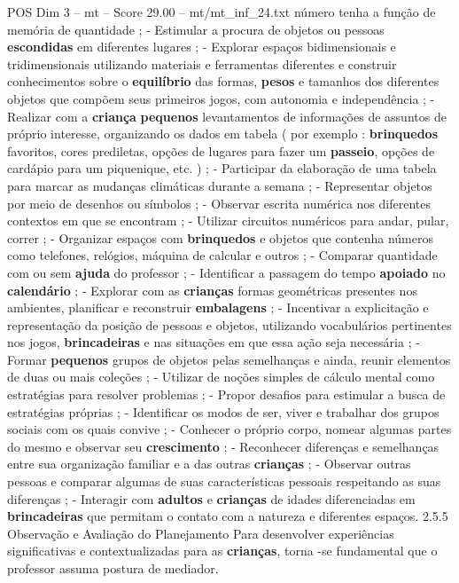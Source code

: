 \begin{textsample}{POS Dim 3 – mt – Score 29.00 – mt/mt\_inf\_24.txt}
número tenha a função de memória de quantidade ; - Estimular a procura de objetos ou pessoas \textbf{escondidas} em diferentes lugares ; - Explorar espaços bidimensionais e tridimensionais utilizando materiais e ferramentas diferentes e construir conhecimentos sobre o \textbf{equilíbrio} das formas, \textbf{pesos} e tamanhos dos diferentes objetos que compõem seus primeiros jogos, com autonomia e independência ; - Realizar com a \textbf{criança} \textbf{pequenos} levantamentos de informações de assuntos de próprio interesse, organizando os dados em tabela ( por exemplo : \textbf{brinquedos} favoritos, cores prediletas, opções de lugares para fazer um \textbf{passeio}, opções de cardápio para um piquenique, etc. ) ; - Participar da elaboração de uma tabela para marcar as mudanças climáticas durante a semana ; - Representar objetos por meio de desenhos ou símbolos ; - Observar escrita numérica nos diferentes contextos em que se encontram ; - Utilizar circuitos numéricos para andar, pular, correr ; - Organizar espaços com \textbf{brinquedos} e objetos que contenha números como telefones, relógios, máquina de calcular e outros ; - Comparar quantidade com ou sem \textbf{ajuda} do professor ; - Identificar a passagem do tempo \textbf{apoiado} no \textbf{calendário} ; - Explorar com as \textbf{crianças} formas geométricas presentes nos ambientes, planificar e reconstruir \textbf{embalagens} ; - Incentivar a explicitação e representação da posição de pessoas e objetos, utilizando vocabulários pertinentes nos jogos, \textbf{brincadeiras} e nas situações em que essa ação seja necessária ; - Formar \textbf{pequenos} grupos de objetos pelas semelhanças e ainda, reunir elementos de duas ou mais coleções ; - Utilizar de noções simples de cálculo mental como estratégias para resolver problemas ; - Propor desafios para estimular a busca de estratégias próprias ; - Identificar os modos de ser, viver e trabalhar dos grupos sociais com os quais convive ; - Conhecer o próprio corpo, nomear algumas partes do mesmo e observar seu \textbf{crescimento} ; - Reconhecer diferenças e semelhanças entre sua organização familiar e a das outras \textbf{crianças} ; - Observar outras pessoas e comparar algumas de suas características pessoais respeitando as suas diferenças ; - Interagir com \textbf{adultos} e \textbf{crianças} de idades diferenciadas em \textbf{brincadeiras} que permitam o contato com a natureza e diferentes espaços. 2.5.5 Observação e Avaliação do Planejamento Para desenvolver experiências significativas e contextualizadas para as \textbf{crianças}, torna -se fundamental que o professor assuma postura de mediador.

\end{textsample}
